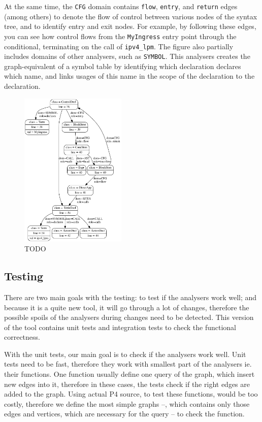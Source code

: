 \documentclass[sigconf]{acmart}
\begin{document}
  At the same time, the \texttt{CFG} domain contains \texttt{flow}, \texttt{entry}, and \texttt{return} edges (among others) to denote the flow of control between various nodes of the syntax tree, and to identify entry and exit nodes. For example, by following these edges, you can see how control flows from the \texttt{MyIngress} entry point through the conditional, terminating on the call of \texttt{ipv4\_lpm}. 
The figure also partially includes domains of other analysers, such as \texttt{SYMBOL}. This analysers creates the graph-equivalent of a symbol table by identifying which declaration declares which name, and links usages of this name in the scope of the declaration to the declaration.

  \begin{figure}
    \includegraphics[width=0.45\textwidth]{figures/output.pdf}
    \caption{TODO}\label{fig:output}
  \end{figure}

	\subsection{Testing}
	There are two main goals with the testing: to test if the analysers work well; and because it is a quite new tool, it will go through a lot of changes, therefore the possible spoils of the analysers during changes need to be detected. This version of the tool contains unit tests and integration tests to check the functional correctness. 
	
	With the unit tests, our main goal is to check if the analysers work well. Unit tests need to be fast, therefore they work with smallest part of the analysers ie. their functions. One function usually define one query of the graph, which insert new edges into it, therefore in these cases, the tests check if the right edges are added to the graph. Using actual P4 source, to test these functions, would be too costly, therefore we define the most simple graphs --, which contains only those edges and vertices, which are necessary for the query -- to check the function.
	
\end{document}

